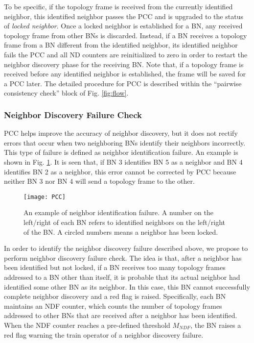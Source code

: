 \documentclass[10pt,english,two column]{IEEEtran}
\begin{document}
To be specific, if the topology frame is received from the currently
identified neighbor, this identified neighbor passes the PCC and is
upgraded to the status of \textit{locked neighbor}. Once a locked
neighbor is established for a BN, any received topology frame from
other BNs is discarded. Instead, if a BN receives a topology frame
from a BN different from the identified neighbor, its identified neighbor
fails the PCC and all ND counters are reinitialized to zero in order
to restart the neighbor discovery phase for the receiving BN. Note
that, if a topology frame is received before any identified neighbor
is established, the frame will be saved for a PCC later. The detailed
procedure for PCC is described within the ``pairwise consistency
check'' block of Fig. \ref{fig:flow}. 


\subsubsection{Neighbor Discovery Failure Check \label{sub:NDFC}}

PCC helps improve the accuracy of neighbor discovery, but it does
not rectify errors that occur when two neighboring BNs identify their
neighbors incorrectly. This type of failure is defined as neighbor
identification failure. An example is shown in Fig. \ref{fig:PCC}.
It is seen that, if BN 3 identifies BN 5 as a neighbor and BN 4 identifies
BN 2 as a neighbor, this error cannot be corrected by PCC because
neither BN 3 nor BN 4 will send a topology frame to the other. 

\begin{figure}[htbp]
\begin{centering}
\textsf{\texttt{[image: PCC]}}
\par\end{centering}

\caption{\label{fig:PCC}An example of neighbor identification failure. A number
on the left/right of each BN refers to identified neighbors on the
left/right of the BN. A circled numbers means a neighbor has been
locked. }
\end{figure}


In order to identify the neighbor discovery failure described above,
we propose to perform neighbor discovery failure check. The idea is
that, after a neighbor has been identified but not locked, if a BN
receives too many topology frames addressed to a BN other than itself,
it is probable that its actual neighbor had identified some other
BN as its neighbor. In this case, this BN cannot successfully complete
neighbor discovery and a red flag is raised. Specifically, each BN
maintains an NDF counter, which counts the number of topology frames
addressed to other BNs that are received after a neighbor has been
identified. When the NDF counter reaches a pre-defined threshold $M_{NDF}$,
the BN raises a red flag warning the train operator of a neighbor
discovery failure. 
\end{document}
